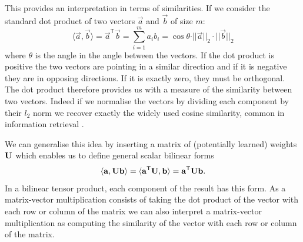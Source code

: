 This provides an interpretation
in terms of similarities. If we consider the standard dot product of two vectors 
\(\vec{a}\) and
\(\vec{b}\) of size \(m\): 
\begin{equation}
\langle\vec{a}, \vec{b}\rangle = 
\vec{a}^\mathsf{T}\vec{b}
= \sum_{i=1}^ma_ib_i
 = {\cos\theta}{\cdot||\vec{a}||_2\cdot||\vec{b}||_2} 
\end{equation} where
\(\theta\) is the angle in the angle between the vectors. If the dot product
is positive the two vectors are pointing in a similar direction and if it is negative they
are in opposing directions. If it is exactly zero, they must be orthogonal. The dot product
therefore provides us with a measure of the similarity between two vectors.
Indeed if we normalise the vectors by dividing each component by their \(l_2\) norm we
recover exactly the widely used cosine similarity, common in information retrieval 
\autocite{Singhal2001, Tan2006}.

We can generalise this idea by inserting a matrix of (potentially learned)
weights \(\mathbf{U}\) which enables us
to define general scalar bilinear forms
\begin{equation}
	\langle\mathbf{a}, \mathbf{U}\mathbf{b}\rangle = \langle\mathbf{a}^\mathsf{T}\mathbf{U}, \mathbf{b}\rangle
	= \mathbf{a}^\mathsf{T}\mathbf{U}\mathbf{b}.
\end{equation} In a bilinear tensor product, each component of the result has this form.
As a matrix-vector multiplication consists of
taking the dot product of the vector with each row or column of the matrix
we can also
interpret a matrix-vector multiplication as computing the similarity of the vector with each
row or column of the matrix. 

